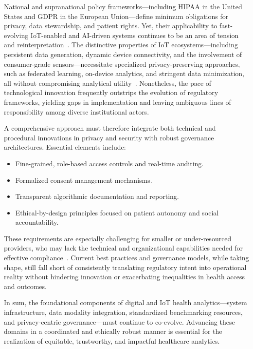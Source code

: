 National and supranational policy frameworks—including HIPAA in the United States and GDPR in the European Union—define minimum obligations for privacy, data stewardship, and patient rights. Yet, their applicability to fast-evolving IoT-enabled and AI-driven systems continues to be an area of tension and reinterpretation~\cite{ref2,ref4,ref5,ref6,ref7,ref8,ref9,ref10,ref24,ref25,ref28,ref30,ref31,ref33,ref34,ref35,ref36,ref41,ref43,ref46,ref50,ref54,ref51,ref61,ref62,ref63,ref64,ref65,ref70,ref71,ref72,ref75,ref76,ref77,ref78,ref79,ref82,ref83,ref84,ref90}. The distinctive properties of IoT ecosystems—including persistent data generation, dynamic device connectivity, and the involvement of consumer-grade sensors—necessitate specialized privacy-preserving approaches, such as federated learning, on-device analytics, and stringent data minimization, all without compromising analytical utility~\cite{ref83,ref84,ref90}. Nonetheless, the pace of technological innovation frequently outstrips the evolution of regulatory frameworks, yielding gaps in implementation and leaving ambiguous lines of responsibility among diverse institutional actors.

A comprehensive approach must therefore integrate both technical and procedural innovations in privacy and security with robust governance architectures. Essential elements include:

\begin{itemize}
    \item Fine-grained, role-based access controls and real-time auditing.
    \item Formalized consent management mechanisms.
    \item Transparent algorithmic documentation and reporting.
    \item Ethical-by-design principles focused on patient autonomy and social accountability.
\end{itemize}

These requirements are especially challenging for smaller or under-resourced providers, who may lack the technical and organizational capabilities needed for effective compliance~\cite{ref82,ref84,ref106}. Current best practices and governance models, while taking shape, still fall short of consistently translating regulatory intent into operational reality without hindering innovation or exacerbating inequalities in health access and outcomes.

In sum, the foundational components of digital and IoT health analytics—system infrastructure, data modality integration, standardized benchmarking resources, and privacy-centric governance—must continue to co-evolve. Advancing these domains in a coordinated and ethically robust manner is essential for the realization of equitable, trustworthy, and impactful healthcare analytics.


